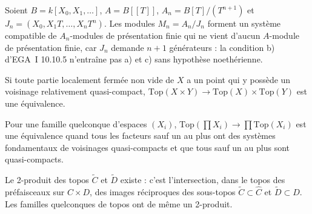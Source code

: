 \begin{encadre}
\begin{theoreme*}\nonverifie
Soient $B = k[X_0, X_1, \ldots]$, $A = B[[T]]$, $A_n = B[T]/(T^{n+1})$ et $J_n = (X_0, X_1T, \ldots, X_nT^n)$. Les modules $M_n = A_n/J_n$ forment un système compatible de $A_n$-modules de présentation finie qui ne vient d'aucun $A$-module de présentation finie, car $J_n$ demande $n+1$ générateurs : la condition b) d'EGA~I 10.10.5 n'entraîne pas a) et c) sans hypothèse noethérienne.
\end{theoreme*}
\end{encadre}

\begin{encadre}
\begin{theoreme*}\nonverifie
Si toute partie localement fermée non vide de $X$ a un point qui y possède un voisinage relativement quasi-compact, $\mathrm{Top}(X \times Y) \to \mathrm{Top}(X) \times \mathrm{Top}(Y)$ est une équivalence.
\end{theoreme*}
\end{encadre}

\begin{encadre}
\begin{theoreme*}\nonverifie
Pour une famille quelconque d'espaces $(X_i)$, $\mathrm{Top}(\prod X_i) \to \prod \mathrm{Top}(X_i)$ est une équivalence quand tous les facteurs sauf un au plus ont des systèmes fondamentaux de voisinages quasi-compacts et que tous sauf un au plus sont quasi-compacts.
\end{theoreme*}
\end{encadre}

\begin{encadre}
\begin{theoreme*}\nonverifie
Le 2-produit des topos $\tilde C$ et $\tilde D$ existe : c'est l'intersection, dans le topos des préfaisceaux sur $C \times D$, des images réciproques des sous-topos $\tilde C \subset \hat C$ et $\tilde D \subset \hat D$. Les familles quelconques de topos ont de même un 2-produit.
\end{theoreme*}
\end{encadre}

